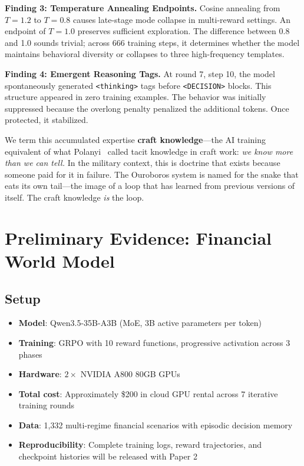 \documentclass[11pt,a4paper]{article}
\begin{document}
\textbf{Finding 3: Temperature Annealing Endpoints.} Cosine annealing from $T=1.2$ to $T=0.8$ causes late-stage mode collapse in multi-reward settings. An endpoint of $T=1.0$ preserves sufficient exploration. The difference between 0.8 and 1.0 sounds trivial; across 666 training steps, it determines whether the model maintains behavioral diversity or collapses to three high-frequency templates.

\textbf{Finding 4: Emergent Reasoning Tags.} At round 7, step 10, the model spontaneously generated \texttt{<thinking>} tags before \texttt{<DECISION>} blocks. This structure appeared in zero training examples. The behavior was initially suppressed because the overlong penalty penalized the additional tokens. Once protected, it stabilized.

We term this accumulated expertise \textbf{craft knowledge}---the AI training equivalent of what Polanyi~\citep{polanyi1966} called tacit knowledge in craft work: \textit{we know more than we can tell.} In the military context, this is doctrine that exists because someone paid for it in failure. The Ouroboros system is named for the snake that eats its own tail---the image of a loop that has learned from previous versions of itself. The craft knowledge \textit{is} the loop.

\section{Preliminary Evidence: Financial World Model}

\subsection{Setup}

\begin{itemize}[leftmargin=*]
\item \textbf{Model}: Qwen3.5-35B-A3B (MoE, 3B active parameters per token)
\item \textbf{Training}: GRPO with 10 reward functions, progressive activation across 3 phases
\item \textbf{Hardware}: $2\times$ NVIDIA A800 80GB GPUs
\item \textbf{Total cost}: Approximately \$200 in cloud GPU rental across 7 iterative training rounds
\item \textbf{Data}: 1,332 multi-regime financial scenarios with episodic decision memory
\item \textbf{Reproducibility}: Complete training logs, reward trajectories, and checkpoint histories will be released with Paper 2
\end{itemize}
\end{document}

